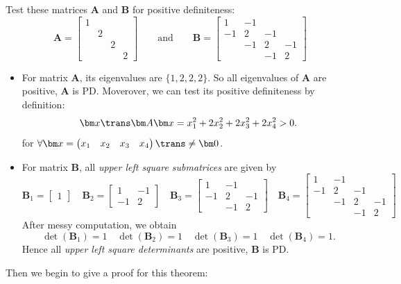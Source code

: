 \begin{example}
Test these matrices $\bm A$ and $\bm B$ for positive definiteness:
\[
\bm A=\begin{bmatrix}
1&&&\\&2&&\\&&2&\\&&&2
\end{bmatrix}\qquad\text{and}\qquad
\bm B=\begin{bmatrix}
1&-1&&\\-1&2&-1&\\&-1&2&-1\\&&-1&2
\end{bmatrix}
\]
\begin{itemize}
\item
For matrix $\bm A$, its eigenvalues are $\{1,2,2,2\}.$ So all eigenvalues of $\bm A$ are positive, $\bm A$ is PD. Moverover, we can test its positive definiteness by definition: 
\[
\bm x\trans\bm A\bm x=x_1^2+2x_2^2+2x_3^2+2x_4^2>0.
\]
for $\forall\bm x=\begin{pmatrix}
x_1&x_2&x_3&x_4
\end{pmatrix}\trans\ne\bm 0$.
\item
For matrix $\bm B$, all \textit{upper left square submatrices} are given by
\[
\bm B_1=\begin{bmatrix}
1
\end{bmatrix}\quad
\bm B_2=\begin{bmatrix}
1&-1\\-1&2
\end{bmatrix}\quad
\bm B_3=\begin{bmatrix}
1&-1&\\-1&2&-1\\&-1&2
\end{bmatrix}\quad
\bm B_4=\begin{bmatrix}
1&-1&&\\-1&2&-1&\\&-1&2&-1\\&&-1&2
\end{bmatrix}
\]
After messy computation, we obtain
\[
\det(\bm B_1)=1\quad\det(\bm B_2)=1\quad
\det(\bm B_3)=1\quad\det(\bm B_4)=1.
\]
Hence all \textit{upper left square determinants} are positive, $\bm B$ is PD.
\end{itemize}
\end{example}
Then we begin to give a proof for this theorem:
